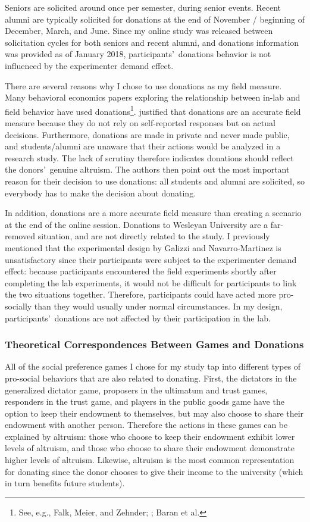 \documentclass[12pt]{article}
\begin{document}
Seniors are solicited around once per semester, during senior events. Recent alumni are typically solicited for donations at the end of November / beginning of December, March, and June. Since my online study was released between solicitation cycles for both seniors and recent alumni, and donations information was provided as of January 2018, participants\rq \ donations behavior is not influenced by the experimenter demand effect. 

There are several reasons why I chose to use donations as my field measure. Many behavioral economics papers exploring the relationship between in-lab and field behavior have used donations\footnote{See, e.g., Falk, Meier, and Zehnder; \cite{benz_meier_2006}; Baran et al.}. \cite{falk_2013} justified that donations are an accurate field measure because they do not rely on self-reported responses but on actual decisions. Furthermore, donations are made in private and never made public, and students/alumni are unaware that their actions would be analyzed in a research study. The lack of scrutiny therefore indicates donations should reflect the donors\rq \ genuine altruism. The authors then point out the most important reason for their decision to use donations: all students and alumni are solicited, so everybody has to make the decision about donating.

In addition, donations are a more accurate field measure than creating a scenario at the end of the online session. Donations to Wesleyan University are a far-removed situation, and are not directly related to the study. I previously mentioned that the experimental design by Galizzi and Navarro-Martinez is unsatisfactory since their participants were subject to the experimenter demand effect: because participants encountered the field experiments shortly after completing the lab experiments, it would not be difficult for participants to link the two situations together. Therefore, participants could have acted more pro-socially than they would usually under normal circumstances. In my design, participants\rq \ donations are not affected by their participation in the lab.

\subsubsection{Theoretical Correspondences Between Games and Donations}

All of the social preference games I chose for my study tap into different types of pro-social behaviors that are also related to donating. First, the dictators in the generalized dictator game, proposers in the ultimatum and trust games, responders in the trust game, and players in the public goods game have the option to keep their endowment to themselves, but may also choose to share their endowment with another person. Therefore the actions in these games can be explained by altruism: those who choose to keep their endowment exhibit lower levels of altruism, and those who choose to share their endowment demonstrate higher levels of altruism. Likewise, altruism is the most common representation for donating since the donor chooses to give their income to the university (which in turn benefits future students). 
\end{document}

